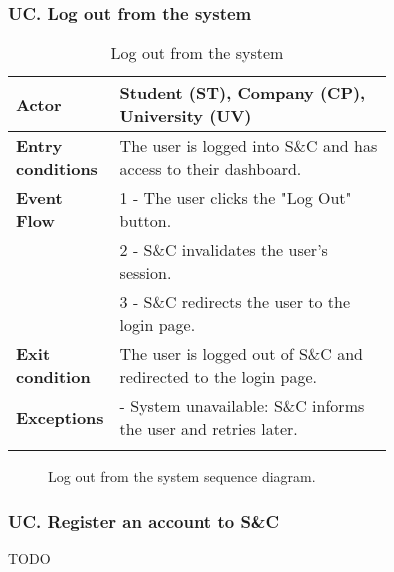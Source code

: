 \subsubsection*{UC\cuc . Log out from the system}
\begin{center}
    \begin{longtable}{|l|p{0.75\linewidth}|}
        \hline
        \textbf{Actor}            & Student (ST), Company (CP), University (UV) \\
        \hline
        \textbf{Entry conditions} & The user is logged into S\&C and has access to their dashboard. \\
        \hline
        \textbf{Event Flow}       & 1 - The user clicks the "Log Out" button. \\
                                  & 2 - S\&C invalidates the user's session. \\
                                  & 3 - S\&C redirects the user to the login page. \\
        \hline
        \textbf{Exit condition}   & The user is logged out of S\&C and redirected to the login page. \\       
        \hline
        \textbf{Exceptions}       & - System unavailable: S\&C informs the user and retries later. \\
        \hline
        \caption{Log out from the system}
        \label{tab:logout_usecase}
    \end{longtable}
\end{center}

\begin{figure}[H]
    \begin{center}
        
        \caption{Log out from the system sequence diagram.}
        \label{fig:logout_seqd}%
    \end{center}
\end{figure}

\subsubsection*{UC\cuc . Register an account to S\&C}
TODO

